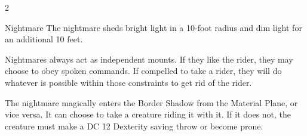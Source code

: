 \begin{multicols}{2}
\begin{DndMonster}{Nightmare}
 The nightmare sheds bright light in a 10-foot radius and dim light for an additional 10 feet.

 Nightmares always act as independent mounts. If they like the rider, they may choose to obey spoken commands. If compelled to take a rider, they will do whatever is possible within those constraints to get rid of the rider.

\DndMonsterAttack[
	name=Hooves,
	distance=melee,
	type=weapon,
	mod=+4,
	reach=5,
	dmg=\DndDice{2d8 + 4},
	dmg-type=bludgeoning,
	extra={ plus 7 (2d6) fire damage.}
]
The nightmare magically enters the Border Shadow from the Material Plane, or vice versa. It can choose to take a creature riding it with it. If it does not, the creature must make a DC 12 Dexterity saving throw or become prone.
\end{DndMonster}
\end{multicols}